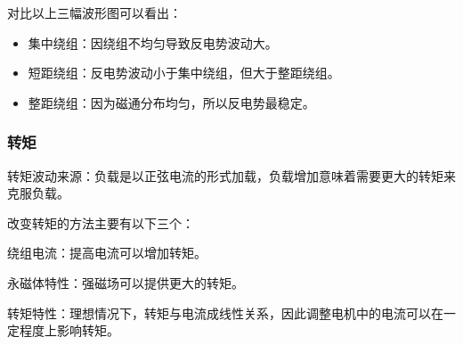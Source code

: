 \documentclass{thuemp}
\begin{document}
对比以上三幅波形图可以看出：

\begin{itemize}
	\item 集中绕组：因绕组不均匀导致反电势波动大。
	\item 短距绕组：反电势波动小于集中绕组，但大于整距绕组。
	\item 整距绕组：因为磁通分布均匀，所以反电势最稳定。
\end{itemize}

\subsubsection{转矩}

转矩波动来源：负载是以正弦电流的形式加载，负载增加意味着需要更大的转矩来克服负载。

改变转矩的方法主要有以下三个：

绕组电流：提高电流可以增加转矩。

永磁体特性：强磁场可以提供更大的转矩。

转矩特性：理想情况下，转矩与电流成线性关系，因此调整电机中的电流可以在一定程度上影响转矩。
\end{document}
